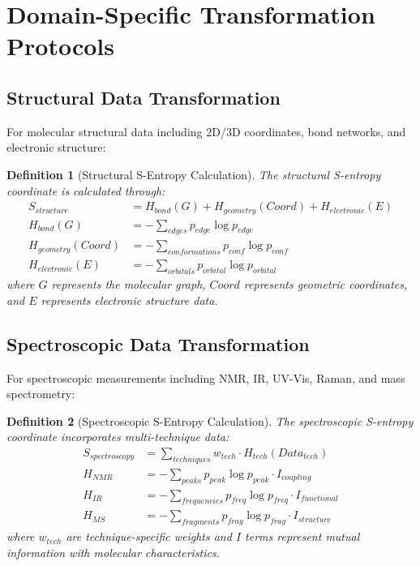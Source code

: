 \documentclass[12pt,a4paper]{article}
\newtheorem{definition}{Definition}
\begin{document}
\section{Domain-Specific Transformation Protocols}

\subsection{Structural Data Transformation}

For molecular structural data including 2D/3D coordinates, bond networks, and electronic structure:

\begin{definition}[Structural S-Entropy Calculation]
The structural S-entropy coordinate is calculated through:
\begin{align}
S_{structure} &= H_{bond}(G) + H_{geometry}(Coord) + H_{electronic}(E) \\
H_{bond}(G) &= -\sum_{edges} p_{edge} \log p_{edge} \\
H_{geometry}(Coord) &= -\sum_{conformations} p_{conf} \log p_{conf} \\
H_{electronic}(E) &= -\sum_{orbitals} p_{orbital} \log p_{orbital}
\end{align}
where $G$ represents the molecular graph, $Coord$ represents geometric coordinates, and $E$ represents electronic structure data.
\end{definition}

\subsection{Spectroscopic Data Transformation}

For spectroscopic measurements including NMR, IR, UV-Vis, Raman, and mass spectrometry:

\begin{definition}[Spectroscopic S-Entropy Calculation]
The spectroscopic S-entropy coordinate incorporates multi-technique data:
\begin{align}
S_{spectroscopy} &= \sum_{techniques} w_{tech} \cdot H_{tech}(Data_{tech}) \\
H_{NMR} &= -\sum_{peaks} p_{peak} \log p_{peak} \cdot I_{coupling} \\
H_{IR} &= -\sum_{frequencies} p_{freq} \log p_{freq} \cdot I_{functional} \\
H_{MS} &= -\sum_{fragments} p_{frag} \log p_{frag} \cdot I_{structure}
\end{align}
where $w_{tech}$ are technique-specific weights and $I$ terms represent mutual information with molecular characteristics.
\end{definition}
\end{document}
